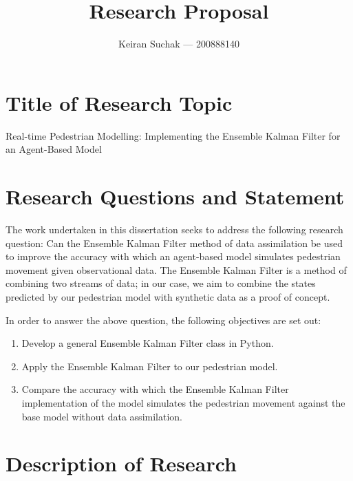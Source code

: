 \documentclass[12pt, twoside, a4paper]{article}
\begin{document}
\title{Research Proposal}
\author{Keiran Suchak --- 200888140}
\maketitle

\section{Title of Research Topic}\label{sec:title}

Real-time Pedestrian Modelling: Implementing the Ensemble Kalman Filter for an
Agent-Based Model

\section{Research Questions and Statement}\label{sec:questions}


The work undertaken in this dissertation seeks to address the following research
question: Can the Ensemble Kalman Filter method of data assimilation be used to
improve the accuracy with which an agent-based model simulates pedestrian
movement given observational data.
The Ensemble Kalman Filter is a method of combining two streams of
data; in our case, we aim to combine the states predicted by our pedestrian
model with synthetic data as a proof of concept.

In order to answer the above question, the following objectives are set out:
\begin{enumerate}
    \item Develop a general Ensemble Kalman Filter class in Python.
    \item Apply the Ensemble Kalman Filter to our pedestrian model.
    \item Compare the accuracy with which the Ensemble Kalman Filter
        implementation of the model simulates the pedestrian movement against
        the base model without data assimilation.
\end{enumerate}

\section{Description of Research}\label{sec:research_descr}
\end{document}
